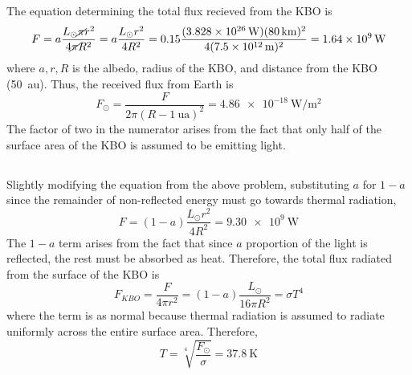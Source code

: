 \documentclass{article}
\begin{document}
\subsection{}

The equation determining the total flux recieved from the KBO is
\begin{equation}
    F = a \frac{L_\odot \cancel{\pi} r^2}{4 \cancel{\pi} R^2} = a \frac{L_\odot r^2}{4 R^2} = 0.15 \frac{(\SI{3.828e+26}{\watt}) (\SI{80}{\kilo\meter})^2}{4 (\SI{7.5e+12}{\meter})^2} = \SI{1.64e+9}{\watt}
\end{equation}
where \(a, r, R\) is the albedo, radius of the KBO, and distance from the KBO (\SI{50}{\astronomicalunit}).
Thus, the received flux from Earth is
\begin{equation} \label{eq:3a}
    F_\odot = \frac{F}{2 \pi (R - \SI{1}{\astronomicalunit})^2} = \SI{4.86e-18}{\watt\per\meter\squared}
\end{equation}
The factor of two in the numerator arises from the fact that only half of the surface area of the KBO is assumed to be emitting light.

\subsection{}

Slightly modifying the equation from the above problem, substituting \(a\) for \(1 - a\) since the remainder of non-reflected energy must go towards thermal radiation,
\begin{equation}
    F = (1 - a) \frac{L_\odot r^2}{4 R^2} = \SI{9.30e+9}{\watt}
\end{equation}
The \(1 - a\) term arises from the fact that since \(a\) proportion of the light is reflected, the rest must be absorbed as heat.
Therefore, the total flux radiated from the surface of the KBO is
\begin{equation}
    F_{KBO} = \frac{F}{4 \pi r^2} = (1 - a) \frac{L_\odot}{16 \pi R^2} = \sigma T^4
\end{equation}
where the term is as normal because thermal radiation is assumed to radiate uniformly across the entire surface area.
Therefore,
\begin{equation}
    T = \sqrt[4]{\frac{F_\odot}{\sigma}} = \SI{37.8}{\kelvin}
\end{equation}

\subsection{}
\end{document}
